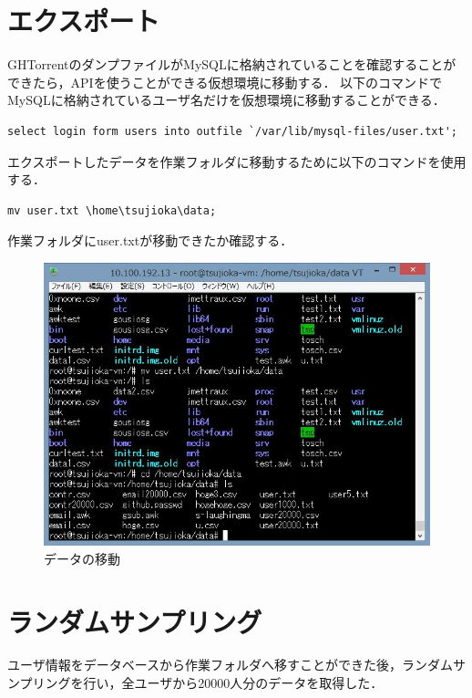  \section{エクスポート}
 
GHTorrentのダンプファイルがMySQLに格納されていることを確認することができたら，APIを使うことができる仮想環境に移動する．
以下のコマンドでMySQLに格納されているユーザ名だけを仮想環境に移動することができる．
\begin{lstlisting}[basicstyle=\ttfamily\footnotesize, frame=single]
select login form users into outfile `/var/lib/mysql-files/user.txt';
\end{lstlisting}

\newpage

エクスポートしたデータを作業フォルダに移動するために以下のコマンドを使用する．
\begin{lstlisting}[basicstyle=\ttfamily\footnotesize, frame=single]
mv user.txt \home\tsujioka\data;
\end{lstlisting}

作業フォルダにuser.txtが移動できたか確認する．

\begin{figure}[htb]
\centering
\includegraphics[width=12cm]{kakuninn.JPG}
\caption{データの移動}\label{サンプル図}
\end{figure}


\newpage


\section{ランダムサンプリング}

ユーザ情報をデータベースから作業フォルダへ移すことができた後，ランダムサンプリングを行い，全ユーザから20000人分のデータを取得した．

